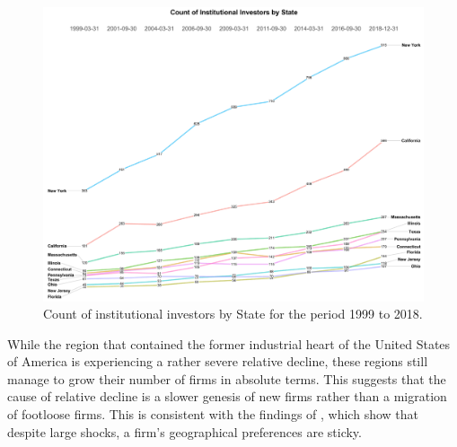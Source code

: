 \begin{figure}[ht]
	\centering
	\includegraphics[width=1\linewidth]{Figures/ChapterIII/Count_II_BY_State}
	\caption[Count of Institutional Investors by State]{Count of institutional investors by State for the period 1999 to 2018.}
	\label{fig:countiibystate}
\end{figure}

While the region that contained the former industrial heart of the United States of America is experiencing a rather severe relative decline, these regions still manage to grow their number of firms in absolute terms.  This suggests that the cause of relative decline is a slower genesis of new firms rather than a migration of footloose firms.  This is consistent with the findings of \cite{gongthe2012}, which show that despite large shocks, a firm's geographical preferences are sticky.  

